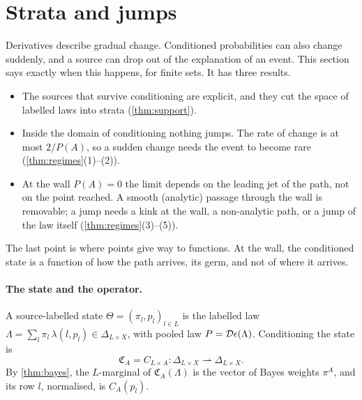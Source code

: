 \documentclass[11pt]{article}
\theoremstyle{definition}\newtheorem{definition}[theorem]{Definition}\newtheorem{remark}[theorem]{Remark}\newtheorem{example}[theorem]{Example}
\begin{document}
\section{Strata and jumps}\label{sec:jumps}
Derivatives describe gradual change. Conditioned probabilities can also change suddenly, and a source can drop out of the explanation of
an event. This section says exactly when this happens, for finite sets. It has three results.
\begin{itemize}
\item The sources that survive conditioning are explicit, and they cut the space of labelled laws into strata (\cref{thm:support}).
\item Inside the domain of conditioning nothing jumps. The rate of change is at most $2/P(A)$, so a sudden change needs the event to
  become rare (\cref{thm:regimes}(1)--(2)).
\item At the wall $P(A)=0$ the limit depends on the leading jet of the path, not on the point reached. A smooth (analytic) passage
  through the wall is removable; a jump needs a kink at the wall, a non-analytic path, or a jump of the law itself (\cref{thm:regimes}(3)--(5)).
\end{itemize}
The last point is where points give way to functions. At the wall, the conditioned state is a function of how the path arrives, its germ,
and not of where it arrives.

\paragraph{The state and the operator.} A source-labelled state $\Theta=(\pi_l,p_l)_{l\in L}$ is the labelled law
$\Lambda=\sum_l\pi_l\,\lambda(l,p_l)\in\Delta_{L\times X}$, with pooled law $P=\mathcal D\epsilon(\Lambda)$. Conditioning the state is
\[
\mathfrak C_A=C_{L\times A}:\Delta_{L\times X}\rightharpoonup\Delta_{L\times X}.
\]
By \cref{thm:bayes}, the $L$-marginal of $\mathfrak C_A(\Lambda)$ is the vector of Bayes weights $\pi^A$, and its row $l$, normalised, is $C_A(p_l)$.
\end{document}
